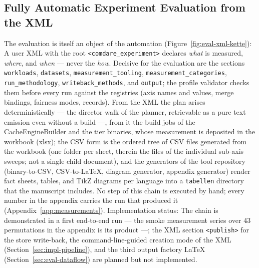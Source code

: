 \begin{nurlang}
\subsection{Fully Automatic Experiment Evaluation from the XML}\label{sec:eval-xml}
The evaluation is itself an object of the automation (Figure~\ref{fig:eval-xml-kette}): A user XML
with the root \texttt{<comdare\_experiment>} declares \emph{what} is measured, \emph{where}, and
\emph{when} --- never the \emph{how}. Decisive for the evaluation are the sections
\texttt{workloads}, \texttt{datasets}, \texttt{measurement\_tooling}, \texttt{measurement\_categories},
\texttt{run\_methodology}, \texttt{writeback\_methods}, and \texttt{output}; the profile validator
checks them before every run against the registries (axis names and values, merge bindings, fairness
modes, records). From the XML the plan arises deterministically --- the director walk of the planner,
retrievable as a pure text emission even without a build ---, from it the build jobs of the
CacheEngineBuilder and the tier binaries, whose measurement is deposited in the workbook (xlsx); the
CSV form is the ordered tree of CSV files generated from the workbook (one folder per sheet, therein the
files of the individual sub-axis sweeps; not a single child document), and the
generators of the tool repository (binary-to-CSV, CSV-to-LaTeX, diagram generator, appendix
generator) render fact sheets, tables, and TikZ diagrams per language into a \texttt{tabellen}
directory that the manuscript includes. No step of this chain is executed by hand; every number in the
appendix carries the run that produced it (Appendix~\ref{app:measurements}).
Implementation status: The chain is demonstrated in a first end-to-end run --- the smoke measurement
series over 43 permutations in the appendix is its product ---; the XML section \texttt{<publish>} for
the store write-back, the command-line-guided creation mode of the XML
(Section~\ref{sec:impl-pipeline}), and the third output factory LaTeX
(Section~\ref{sec:eval-dataflow}) are planned but not implemented.
\begin{figure}[htbp]\centering
{}
\end{figure}
\end{nurlang}
